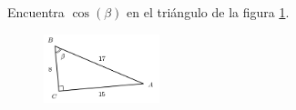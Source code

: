 \question[15] Encuentra $\cos(\beta)$ en el triángulo de la figura \ref{fig:functrig08}.
\begin{figure}[H]
    \begin{center}
        \includegraphics[width=0.3\textwidth]{../images/functrig08.png}
    \end{center}
    \caption{}
    \label{fig:functrig08}
\end{figure}

